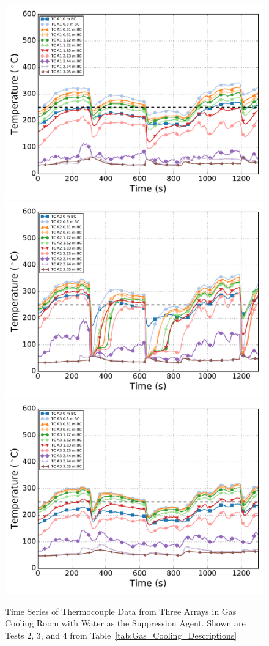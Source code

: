 \documentclass[12pt,oneside]{book}
\begin{document}
\begin{figure}[ht!]
	\includegraphics[width=.5\columnwidth]{../Figures/Gas_Cooling/GCSeries12_TC_A1}
	\includegraphics[width=.5\columnwidth]{../Figures/Gas_Cooling/GCSeries12_TC_A2}
	\includegraphics[width=.5\columnwidth]{../Figures/Gas_Cooling/GCSeries12_TC_A3}
	\caption{Time Series of Thermocouple Data from Three Arrays in Gas Cooling Room with Water as the Suppression Agent. Shown are Tests 2, 3, and 4 from Table~\ref{tab:Gas_Cooling_Descriptions}}
	\label{fig:gas_cooling_sub1}
\end{figure}
\end{document}
